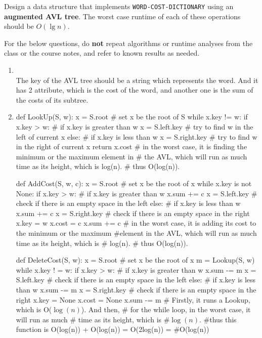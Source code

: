 \documentclass{assignment-263}
\begin{document}
\begin{enumerate}
Design a data structure that implements \verb|WORD-COST-DICTIONARY| using an
\textbf{augmented AVL tree}.
The worst case runtime of each of these operations should be $O(\lg n)$.

For the below questions, do \textbf{not} repeat algorithms or runtime analyses
from the class or the course notes, and refer to known results as needed.

\begin{enumerate}
  \item \\
  The key of the AVL tree should be a string which represents the word. And it has 2 attribute, which is the cost of the word, and another one is the sum of the costs of its subtree.
  \item 
     \begin{python}
   def LookUp(S, w):
     x = S.root   # set x be the root of S
     while x.key != w:
       if x.key > w:   # if x.key is greater than w
         x = S.left.key #  try to find w in the left of current x
       else:           # if x.key is less than w 
         x = S.right.key # try to find w in the right of current x
     return x.cost
     # in the worst case, it is finding the minimum or the maximum element in 
     # the AVL, which will run as much time as its height, which is log(n).
     # thus O(log(n)).
        
    def AddCost(S, w, c):
      x = S.root # set x be the root of x
      while x.key is not None:
        if x.key > w:   # if x.key is greater than w
         x.sum += c
         x = S.left.key # check if there is an empty space in the left 
        else:           # if x.key is less than w 
         x.sum += c
         x = S.right.key # check if there is an empty space in the right
      x.key = w
      x.cost = c
      x.sum += c
      # in the worst case, it is adding its cost to the minimum or the maximum
      #element in the AVL, which will run as much time as its height, which is 
      # log(n).
      # thus O(log(n)).
      
    def DeleteCost(S, w):
      x = S.root # set x be the root of x
      m = Lookup(S, w)
      while x.key ! = w:
        if x.key > w:   # if x.key is greater than w
         x.sum -= m
         x = S.left.key # check if there is an empty space in the left
        else:           # if x.key is less than w 
         x.sum -= m
         x = S.right.key # check if there is an empty space in the right
      x.key = None
      x.cost = None
      x.sum -= m
     # Firstly, it runs a Lookup, which is O($\log(n)$). And then,
     # for the while loop, in the worst case, it will run as much
     # time as its height, which is #$\log(n)$.
     #thus this function is O(log(n)) + O(log(n)) = O(2log(n)) = #O(log(n))
   \end{python}


\end{enumerate}
\end{enumerate}
\end{document}
